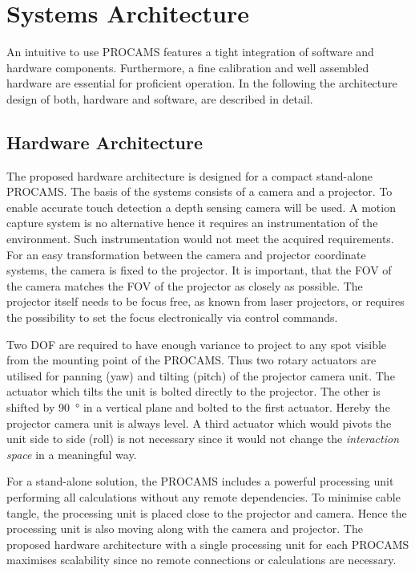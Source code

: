 
\chapter{Systems Architecture}
An intuitive to use \ac{PROCAMS} features a tight integration of software and hardware components.
Furthermore, a  fine calibration and well assembled hardware are essential for proficient operation. In the following the architecture design of both, hardware and software, are described in detail.

\section{Hardware Architecture}
The proposed hardware architecture is designed for a compact stand-alone \ac{PROCAMS}. The basis of the systems consists of a camera and a projector. To enable accurate touch detection a depth sensing camera will be used. A motion capture system is no alternative hence it requires an instrumentation of the environment. Such instrumentation would not meet the acquired requirements.
For an easy transformation between the camera and projector coordinate systems, the camera is fixed to the projector. It is important, that the \ac{FOV} of the camera matches the \ac{FOV} of the projector as closely as possible. The projector itself needs to be focus free, as known from laser projectors, or requires the possibility to set the focus electronically via control commands.

Two \ac{DOF} are required to have enough variance to project to any spot visible from the mounting point of the PROCAMS. Thus two rotary actuators are utilised for panning (yaw) and tilting (pitch) of the projector camera unit. The actuator which tilts the unit is bolted directly to the projector. The other is shifted by \SI{90}{\degree} in a vertical plane and bolted to the first actuator. Hereby the projector camera unit is always level. A third actuator which would pivots the unit side to side (roll) is not necessary since it would not change the \emph{interaction space} in a meaningful way.

For a stand-alone solution, the \ac{PROCAMS} includes a powerful processing unit performing all calculations without any remote dependencies. To minimise cable tangle, the processing unit is placed close to the projector and camera. Hence the processing unit is also moving along with the camera and projector. The proposed hardware architecture with a single processing unit for each PROCAMS maximises scalability since no remote connections or calculations are necessary.

